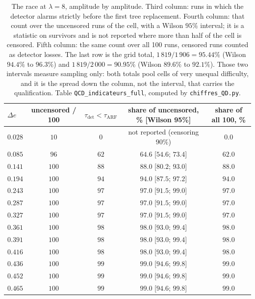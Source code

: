 \documentclass[10pt,conference]{IEEEtran}
\theoremstyle{definition}
\begin{document}
\begin{table}[t]
  \centering
\caption{The race at $\lambda = 8$, amplitude by amplitude. Third column: runs in which
  the detector alarms strictly before the first tree replacement. Fourth column: that count
  over the uncensored runs of the cell, with a Wilson $95\%$ interval; it is a statistic on
  survivors and is not reported where more than half of the cell is censored. Fifth column:
  the same count over all 100 runs, censored runs counted as detector losses. The last row
  is the grid total, $1\,819/1\,906 = 95.44\%$ (Wilson $94.4\%$ to $96.3\%$) and
  $1\,819/2\,000 = 90.95\%$ (Wilson $89.6\%$ to $92.1\%$). Those two intervals measure
  sampling only: both totals pool cells of very unequal difficulty, and it is the spread
  down the column, not the interval, that carries the qualification. Table
  \texttt{QCD\_indicateurs\_full}, computed by \texttt{chiffres\_QD.py}.}
\label{tab:course}
  \small
  \begin{tabular}{lcccc}
    \toprule
    $\Delta e$ & uncensored / 100 & $\tau_{\mathrm{det}} < \tau_{\mathrm{ARF}}$ & share of uncensored, \% [Wilson 95\%] & share of all 100, \% \\
    \midrule
    $0.028$ & $10$  & $0$  & not reported (censoring $90\%$) & $0.0$ \\
    $0.085$ & $96$  & $62$ & $64.6$ [$54.6$; $73.4$] & $62.0$ \\
    $0.141$ & $100$ & $88$ & $88.0$ [$80.2$; $93.0$] & $88.0$ \\
    $0.194$ & $100$ & $94$ & $94.0$ [$87.5$; $97.2$] & $94.0$ \\
    $0.243$ & $100$ & $97$ & $97.0$ [$91.5$; $99.0$] & $97.0$ \\
    $0.287$ & $100$ & $97$ & $97.0$ [$91.5$; $99.0$] & $97.0$ \\
    $0.327$ & $100$ & $97$ & $97.0$ [$91.5$; $99.0$] & $97.0$ \\
    $0.361$ & $100$ & $98$ & $98.0$ [$93.0$; $99.4$] & $98.0$ \\
    $0.391$ & $100$ & $98$ & $98.0$ [$93.0$; $99.4$] & $98.0$ \\
    $0.416$ & $100$ & $98$ & $98.0$ [$93.0$; $99.4$] & $98.0$ \\
    $0.436$ & $100$ & $99$ & $99.0$ [$94.6$; $99.8$] & $99.0$ \\
    $0.452$ & $100$ & $99$ & $99.0$ [$94.6$; $99.8$] & $99.0$ \\
    $0.465$ & $100$ & $99$ & $99.0$ [$94.6$; $99.8$] & $99.0$ \\

\end{tabular}
\end{table}
\end{document}
